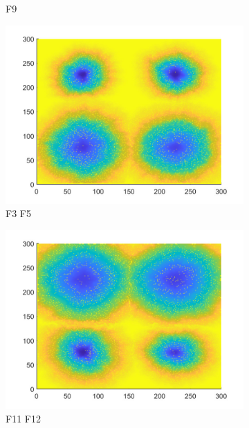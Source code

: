 \documentclass[a4paper,12pt]{article}
\begin{document}
\begin{figure}[H]
\begin{subfigure}{0.3\textwidth}
		\caption{F9}
	\end{subfigure}
	\begin{subfigure}{0.3\textwidth}
		\includegraphics[width=\textwidth]{./T5Figure/K2N1/K2N1L.pdf}
		\caption{F3 F5}
	\end{subfigure}
	\begin{subfigure}{0.3\textwidth}
		\includegraphics[width=\textwidth]{./T5Figure/K2N2/K2N2L.pdf}
		\caption{F11 F12}
	\end{subfigure}
	\begin{subfigure}{0.3\textwidth}

\end{subfigure}
\end{figure}
\end{document}
